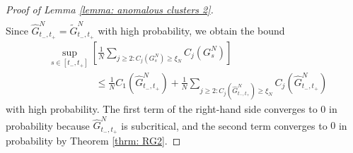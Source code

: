 \documentclass[11pt, notitlepage]{article}
\begin{document}
\begin{proof}[Proof of Lemma \ref{lemma: anomalous clusters 2}]
\begin{equation}
\begin{split}
\end{split} \end{equation} Since $\widehat{G}^N_{t_-,t_+}=\widetilde{G}^N_{t_-,t_+}$ with high probability, we obtain the bound \begin{equation}\begin{split}
    &\sup_{s\in [t_-, t_+]} \left[\frac{1}{N}\sum_{j\geq 2: C_j(G^N_s)\geq \xi_N} C_j(G^N_s)\right] \\[1ex]&\hspace{2cm} \leq \frac{1}{N}C_1(\widehat{G}^N_{t_-, t_+})+\frac{1}{N}\sum_{j\geq 2: C_j(\widehat{G}^N_{t_-,t_+})\geq \xi_N} C_j(\widehat{G}^N_{t_-,t_+})
\end{split} \end{equation} with high probability. The first term of the right-hand side converges to $0$ in probability  because $\widehat{G}^N_{t_-,t_+}$ is subcritical, and the second term converges to $0$ in probability by Theorem \ref{thrm: RG2}. \end{proof} 
\end{document}

